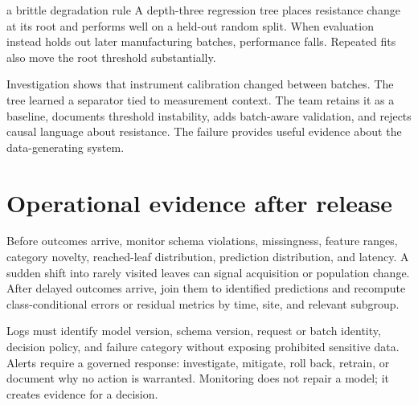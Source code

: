 \begin{workedexample}{a brittle degradation rule}
A depth-three regression tree places resistance change at its root and performs
well on a held-out random split. When evaluation instead holds out later
manufacturing batches, performance falls. Repeated fits also move the root
threshold substantially.

Investigation shows that instrument calibration changed between batches. The
tree learned a separator tied to measurement context. The team retains it as a
baseline, documents threshold instability, adds batch-aware validation, and
rejects causal language about resistance. The failure provides useful evidence
about the data-generating system.
\end{workedexample}

\section{Operational evidence after release}

Before outcomes arrive, monitor schema violations, missingness, feature ranges,
category novelty, reached-leaf distribution, prediction distribution, and
latency. A sudden shift into rarely visited leaves can signal acquisition or
population change. After delayed outcomes arrive, join them to identified
predictions and recompute class-conditional errors or residual metrics by time,
site, and relevant subgroup.

Logs must identify model version, schema version, request or batch identity,
decision policy, and failure category without exposing prohibited sensitive
data. Alerts require a governed response: investigate, mitigate, roll back,
retrain, or document why no action is warranted. Monitoring does not repair a
model; it creates evidence for a decision.

